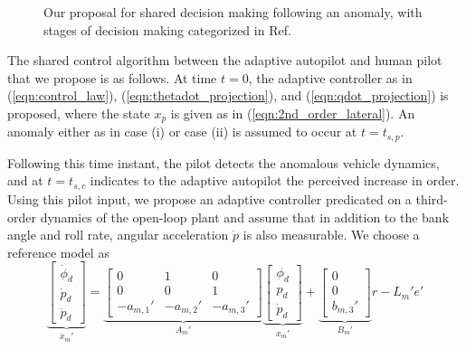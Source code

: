 \begin{figure}[h]

	\caption{Our proposal for shared decision making following an anomaly, with stages of decision making categorized in Ref.~\cite{parasuraman2000model}}
	\label{fig:response_flow}
\end{figure}

The shared control algorithm between the adaptive autopilot and human pilot that we propose is as follows. At time $t=0$, the adaptive controller as in (\ref{eqn:control_law}), (\ref{eqn:thetadot_projection}), and (\ref{eqn:qdot_projection}) is proposed, where the state $x_p$ is given as in (\ref{eqn:2nd_order_lateral}). An anomaly either as in case (i) or case (ii) is assumed to occur at $t=t_{s,p}$. 

Following this time instant, the pilot detects the anomalous vehicle dynamics, and at $t=t_{s,c}$ indicates to the adaptive autopilot the perceived increase in order. Using this pilot input, we propose an adaptive controller predicated on a third-order dynamics of the open-loop plant and assume that in addition to the bank angle and roll rate, angular acceleration $\dot{p}$ is also measurable. We choose a reference model as
\begin{equation}
	\underbrace{\begin{bmatrix}
		\dot{\phi}_d \\ \dot{p}_d \\ \ddot{p}_d
	\end{bmatrix}}_{\dot{x}_m'} = \underbrace{\begin{bmatrix}
		0 & 1 & 0\\ 0 & 0 & 1 \\ -a_{m,1}' & -a_{m,2}' & -a_{m,3}'
	\end{bmatrix}}_{A_m'} \underbrace{\begin{bmatrix}
		\phi_d \\ p_d \\ \dot{p}_d
	\end{bmatrix}}_{x_m'} + \underbrace{\begin{bmatrix}
		0 \\ 0 \\ b_{m,3}'
	\end{bmatrix}}_{B_m'} r - L_m' e'
	\label{eqn:rm_3_symbolic}
\end{equation}

